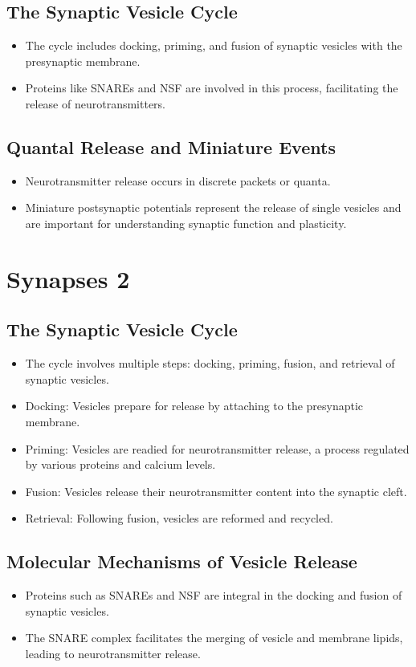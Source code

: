 \documentclass{article}
\begin{document}
\subsection{The Synaptic Vesicle Cycle}
\begin{itemize}
    \item The cycle includes docking, priming, and fusion of synaptic vesicles with the presynaptic membrane.
    \item Proteins like SNAREs and NSF are involved in this process, facilitating the release of neurotransmitters.
\end{itemize}

\subsection{Quantal Release and Miniature Events}
\begin{itemize}
    \item Neurotransmitter release occurs in discrete packets or quanta.
    \item Miniature postsynaptic potentials represent the release of single vesicles and are important for understanding synaptic function and plasticity.
\end{itemize}

\section{Synapses 2}

\subsection{The Synaptic Vesicle Cycle}
\begin{itemize}
    \item The cycle involves multiple steps: docking, priming, fusion, and retrieval of synaptic vesicles.
    \item Docking: Vesicles prepare for release by attaching to the presynaptic membrane.
    \item Priming: Vesicles are readied for neurotransmitter release, a process regulated by various proteins and calcium levels.
    \item Fusion: Vesicles release their neurotransmitter content into the synaptic cleft.
    \item Retrieval: Following fusion, vesicles are reformed and recycled.
\end{itemize}

\subsection{Molecular Mechanisms of Vesicle Release}
\begin{itemize}
    \item Proteins such as SNAREs and NSF are integral in the docking and fusion of synaptic vesicles.
    \item The SNARE complex facilitates the merging of vesicle and membrane lipids, leading to neurotransmitter release.
\end{itemize}
\end{document}
